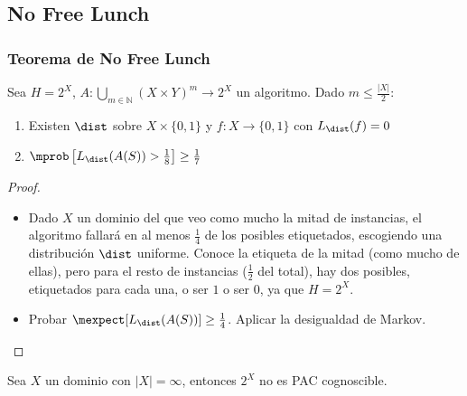 \subsection{No Free Lunch}
\begin{frame}\frametitle{Teorema de No Free Lunch}
\begin{theorem}
 Sea $H = 2^X$, $A: \underset{m\in \mathbb{N}}{\bigcup} (X\times Y)^m \rightarrow 2^X$ un algoritmo. Dado $m \le \frac{|X|}{2}$:
 \begin{enumerate}[i]
 \item Existen $\dist$ sobre $X\times\{0,1\}$ y $f: X \rightarrow \{0,1\}$ con $L_{\dist}(f)=0$
 \item $\mprob \left[ L_{\dist}(A(S)) > \frac{1}{8} \right] \ge \frac{1}{7}$
 \end{enumerate}
\end{theorem}

\begin{proof}
 \begin{itemize}
  \justifying
  \item Dado $X$ un dominio del que veo como mucho la mitad de instancias, el algoritmo fallará en al menos $\frac{1}{4}$ de los posibles etiquetados,
  escogiendo una distribución $\dist$ uniforme. Conoce la etiqueta de la mitad (como mucho de ellas), pero para el resto de instancias ($\frac{1}{2}$ del total),
  hay dos posibles, etiquetados para cada una, o ser $1$ o ser $0$, ya que $H=2^X$.
  \item Probar $\mexpect [L_{\dist} (A(S))] \ge \frac{1}{4}$. Aplicar la desigualdad de Markov.
 \end{itemize}
\end{proof}

\begin{corollary}
 Sea $X$ un dominio con $|X| = \infty$, entonces $2^X$ no es PAC cognoscible.
\end{corollary}
\end{frame}

